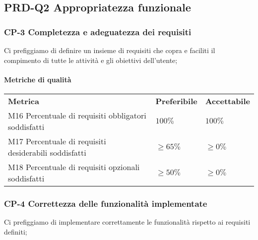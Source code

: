     \subsection{PRD-Q2 Appropriatezza funzionale}
        \subsubsection{CP-3 Completezza e adeguatezza dei requisiti}
        	Ci prefiggiamo di definire un insieme di requisiti che copra e faciliti il compimento di tutte le attività e gli obiettivi dell'utente;
        \paragraph{Metriche di qualità}
        \begin{longtable} {
        		>{}p{80mm} 
        		>{}p{25mm}
        		>{}p{25mm}
        	}
        	\rowcolor{gray!50}
        	\textbf{Metrica} & \textbf{Preferibile} & \textbf{Accettabile} \TBstrut \TBstrut \\
        	M16 Percentuale di requisiti obbligatori soddisfatti & $100\%$ & $100\%$ \TBstrut \\ [2mm]
        	M17 Percentuale di requisiti desiderabili soddisfatti & $\ge65\%$ & $\ge0\%$ \TBstrut \\ [2mm]
        	M18 Percentuale di requisiti opzionali soddisfatti & $\ge50\%$ & $\ge0\%$ \TBstrut \\ [2mm]
        \end{longtable}
    \subsubsection{CP-4 Correttezza delle funzionalità implementate}
    	Ci prefiggiamo di implementare correttamente le funzionalità rispetto ai requisiti definiti;
